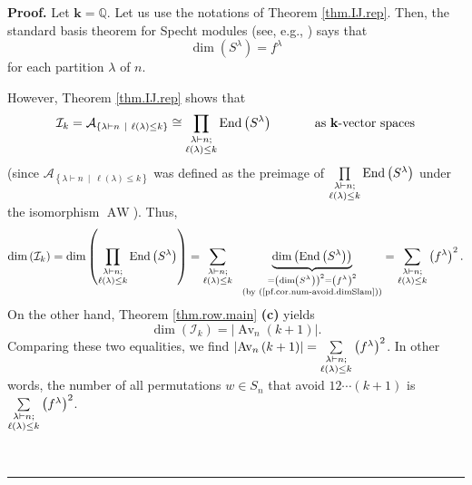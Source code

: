 \documentclass[numbers=enddot,12pt,final,onecolumn,notitlepage]{scrartcl}%
\numberwithin{exer}{subsection}
\theoremstyle{definition}
\newenvironment{proof}[1][Proof]{\noindent\textbf{#1.} }{\ \rule{0.5em}{0.5em}}
\let\sumnonlimits\sum
\let\prodnonlimits\prod
\renewcommand{\sum}{\sumnonlimits\limits}
\renewcommand{\prod}{\prodnonlimits\limits}
\begin{document}
\begin{proof}
Let $\mathbf{k}=\mathbb{Q}$. Let us use the notations of Theorem
\ref{thm.IJ.rep}. Then, the standard basis theorem for Specht modules (see,
e.g., \cite[Lemma 5.9.17]{sga}) says that
\begin{equation}
\dim\left(  S^{\lambda}\right)  =f^{\lambda} \label{pf.cor.num-avoid.dimSlam}%
\end{equation}
for each partition $\lambda$ of $n$.

However, Theorem \ref{thm.IJ.rep} shows that%
\[
\mathcal{I}_{k}=\mathcal{A}_{\left\{  \lambda\vdash n\ \mid\ \ell\left(
\lambda\right)  \leq k\right\}  }\cong\prod\limits_{\substack{\lambda\vdash
n;\\\ell\left(  \lambda\right)  \leq k}}\operatorname*{End}\left(  S^{\lambda
}\right)  \ \ \ \ \ \ \ \ \ \ \text{as }\mathbf{k}\text{-vector spaces}%
\]
(since $\mathcal{A}_{\left\{  \lambda\vdash n\ \mid\ \ell\left(
\lambda\right)  \leq k\right\}  }$ was defined as the preimage of
$\prod\limits_{\substack{\lambda\vdash n;\\\ell\left(  \lambda\right)  \leq
k}}\operatorname*{End}\left(  S^{\lambda}\right)  $ under the isomorphism
$\operatorname*{AW}$). Thus,%
\[
\dim\left(  \mathcal{I}_{k}\right)  =\dim\left(  \prod
\limits_{\substack{\lambda\vdash n;\\\ell\left(  \lambda\right)  \leq
k}}\operatorname*{End}\left(  S^{\lambda}\right)  \right)  =\sum
\limits_{\substack{\lambda\vdash n;\\\ell\left(  \lambda\right)  \leq
k}}\ \ \underbrace{\dim\left(  \operatorname*{End}\left(  S^{\lambda}\right)
\right)  }_{\substack{=\left(  \dim\left(  S^{\lambda}\right)  \right)
^{2}=\left(  f^{\lambda}\right)  ^{2}\\\text{(by
(\ref{pf.cor.num-avoid.dimSlam}))}}}=\sum\limits_{\substack{\lambda\vdash
n;\\\ell\left(  \lambda\right)  \leq k}}\left(  f^{\lambda}\right)  ^{2}.
\]
On the other hand, Theorem \ref{thm.row.main} \textbf{(c)} yields
\[
\dim\left(  \mathcal{I}_{k}\right)  =\left\vert \operatorname*{Av}%
\nolimits_{n}\left(  k+1\right)  \right\vert .
\]
Comparing these two equalities, we find $\left\vert \operatorname*{Av}%
\nolimits_{n}\left(  k+1\right)  \right\vert =\sum\limits_{\substack{\lambda
\vdash n;\\\ell\left(  \lambda\right)  \leq k}}\left(  f^{\lambda}\right)
^{2}$. In other words, the number of all permutations $w\in S_{n}$ that avoid
$12\cdots\left(  k+1\right)  $ is $\sum\limits_{\substack{\lambda\vdash
n;\\\ell\left(  \lambda\right)  \leq k}}\left(  f^{\lambda}\right)  ^{2}$.


\end{proof}
\end{document}
